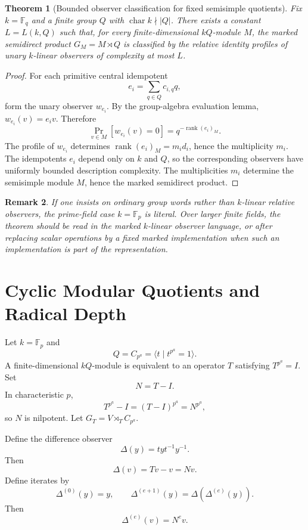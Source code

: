 \documentclass[11pt]{article}
\newtheorem{theorem}{Theorem}[section]
\newtheorem{remark}[theorem]{Remark}
\begin{document}
\begin{theorem}[Bounded observer classification for fixed semisimple quotients]
Fix $k=\mathbb F_q$ and a finite group $Q$ with $\operatorname{char}k\nmid |Q|$. There exists a constant $L=L(k,Q)$ such that, for every finite-dimensional $kQ$-module $M$, the marked semidirect product $G_M=M\rtimes Q$ is classified by the relative identity profiles of unary $k$-linear observers of complexity at most $L$.
\end{theorem}

\begin{proof}
For each primitive central idempotent
\[
e_i=\sum_{q\in Q}c_{i,q}q,
\]
form the unary observer $w_{e_i}$. By the group-algebra evaluation lemma, $w_{e_i}(v)=e_iv$. Therefore
\[
\Pr_{v\in M}[w_{e_i}(v)=0]
=
q^{-\operatorname{rank}(e_i)_M}.
\]
The profile of $w_{e_i}$ determines $\operatorname{rank}(e_i)_M=m_i d_i$, hence the multiplicity $m_i$. The idempotents $e_i$ depend only on $k$ and $Q$, so the corresponding observers have uniformly bounded description complexity. The multiplicities $m_i$ determine the semisimple module $M$, hence the marked semidirect product.
\end{proof}

\begin{remark}
If one insists on ordinary group words rather than $k$-linear relative observers, the prime-field case $k=\mathbb F_p$ is literal. Over larger finite fields, the theorem should be read in the marked $k$-linear observer language, or after replacing scalar operations by a fixed marked implementation when such an implementation is part of the representation.
\end{remark}

\section{Cyclic Modular Quotients and Radical Depth}

Let $k=\mathbb F_p$ and
\[
Q=C_{p^a}=\langle t\mid t^{p^a}=1\rangle.
\]
A finite-dimensional $kQ$-module is equivalent to an operator $T$ satisfying $T^{p^a}=I$. Set
\[
N=T-I.
\]
In characteristic $p$,
\[
T^{p^a}-I=(T-I)^{p^a}=N^{p^a},
\]
so $N$ is nilpotent. Let $G_T=V\rtimes_T C_{p^a}$.

Define the difference observer
\[
\Delta(y)=tyt^{-1}y^{-1}.
\]
Then
\[
\Delta(v)=Tv-v=Nv.
\]
Define iterates by
\[
\Delta^{(0)}(y)=y,
\qquad
\Delta^{(e+1)}(y)=\Delta(\Delta^{(e)}(y)).
\]
Then
\[
\Delta^{(e)}(v)=N^e v.
\]
\end{document}
